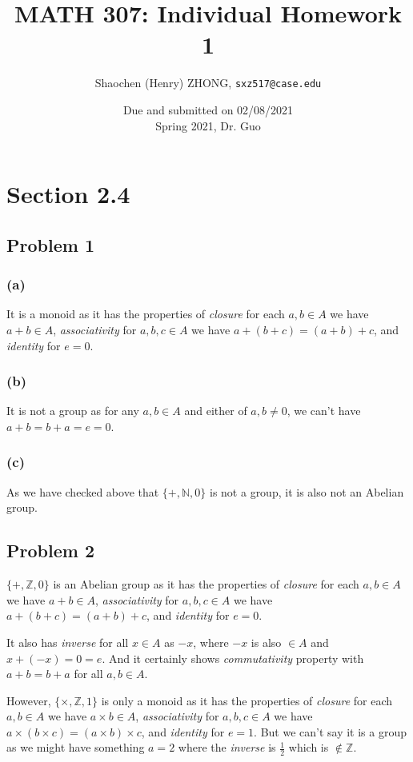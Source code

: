 \documentclass[11pt]{article}
\newcommand{\ilc}{\texttt}
\begin{document}
\title{\textbf{MATH 307: Individual Homework 1}}


\author{
Shaochen (Henry) ZHONG, \ilc{sxz517@case.edu}}

\date{Due and submitted on 02/08/2021 \\ Spring 2021, Dr. Guo}
\maketitle



\section*{Section 2.4}
\subsection*{Problem 1}
\subsubsection*{(a)}
It is a monoid as it has the properties of \textit{closure} for each $a, b \in A$ we have $a + b \in A$, \textit{associativity} for $a, b, c \in A$ we have $a + (b + c) = (a + b) + c$, and \textit{identity} for $e = 0$.

\subsubsection*{(b)}
It is not a group as for any $a, b \in A$ and either of $a,b \neq 0$, we can't have $a + b = b + a = e = 0$.

\subsubsection*{(c)}
As we have checked above that $\{+, \mathbb{N}, 0\}$ is not a group, it is also not an Abelian group.

\subsection*{Problem 2}

$\{+, \mathbb{Z}, 0\}$ is an Abelian group as it has the properties of \textit{closure} for each $a, b \in A$ we have $a + b \in A$, \textit{associativity} for $a, b, c \in A$ we have $a + (b + c) = (a + b) + c$, and \textit{identity} for $e = 0$.

It also has \textit{inverse} for all $x \in A$ as $-x$, where $-x$ is also $\in A$ and $x + (-x) = 0 = e$. And it certainly shows \textit{commutativity} property with $a + b = b + a$ for all  $a, b \in A$.\newline

\noindent However, $\{\times, \mathbb{Z}, 1\}$ is only a monoid as it has the properties of \textit{closure} for each $a, b \in A$ we have $a \times b \in A$, \textit{associativity} for $a, b, c \in A$ we have $a \times (b \times c) = (a \times b) \times c$, and  \textit{identity} for $e = 1$. But
we can't say it is a group as we might have something $a = 2$ where the \textit{inverse} is $\frac{1}{2}$ which is $\not\in \mathbb{Z}$.
\end{document}
